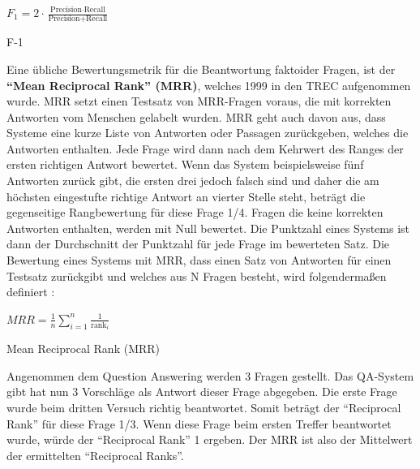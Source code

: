 \documentclass[
        ngerman,
        paper=a4,
        numbers=noendperiod,
]{scrreprt}
\begin{document}
\begin{xequation-} 
\centering ${F_1}= 2 \cdot \frac{\text{Precision} \cdot \text{Recall}}{\text{Precision} + \text{Recall}}$
\caption[F-1]{F-1} 
    \label{eqn:FME}
\end{xequation-} 




Eine übliche Bewertungsmetrik für die Beantwortung faktoider Fragen, ist der \textbf{\enquote{Mean Reciprocal Rank} (MRR)}, welches 1999 in den TREC \citep{voorhees1999proceedings} aufgenommen wurde. MRR setzt einen Testsatz von MRR-Fragen voraus, die mit korrekten Antworten vom Menschen gelabelt wurden. MRR geht auch davon aus, dass Systeme eine kurze Liste von Antworten oder Passagen zurückgeben, welches die Antworten enthalten. Jede Frage wird dann nach dem Kehrwert des Ranges der ersten richtigen Antwort bewertet. Wenn das System beispielsweise fünf Antworten zurück gibt, die ersten drei jedoch falsch sind und daher die am höchsten eingestufte richtige Antwort an vierter Stelle steht, beträgt die gegenseitige Rangbewertung für diese Frage 1/4. Fragen die keine korrekten Antworten enthalten, werden mit Null bewertet. Die Punktzahl eines Systems ist dann der Durchschnitt der Punktzahl für jede Frage im bewerteten Satz. Die Bewertung eines Systems mit MRR, dass einen Satz von Antworten für einen Testsatz zurückgibt und welches aus N Fragen besteht, wird folgendermaßen definiert \citep [S. 483]{Jurafsky2014SpeechProcessing}:

\begin{xequation-} 
\centering ${MRR}= \frac{1}{n} \sum_{i=1}^{n} \frac{1}{\text{rank}_i}$
\caption[Mean Reciprocal Rank (MRR)]{Mean Reciprocal Rank (MRR)} 
    \label{eqn:MRR}
\end{xequation-} 

Angenommen dem Question Answering werden 3 Fragen gestellt. Das QA-System gibt hat nun 3 Vorschläge als Antwort dieser Frage abgegeben. Die erste Frage wurde beim dritten Versuch richtig beantwortet. Somit beträgt der \enquote{Reciprocal Rank} für diese Frage 1/3. Wenn diese Frage beim ersten Treffer beantwortet wurde, würde der \enquote{Reciprocal Rank} 1 ergeben. Der MRR ist also der Mittelwert der ermittelten \enquote{Reciprocal Ranks}.






\end{document}
